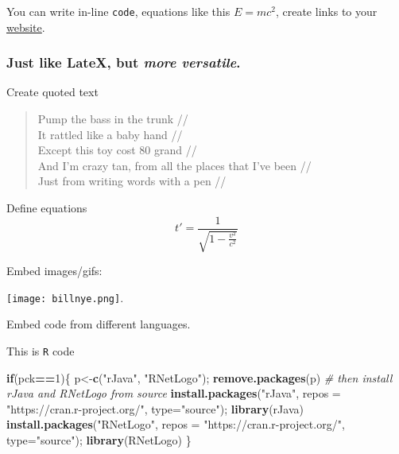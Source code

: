 \documentclass[10,portrait]{article}
\newenvironment{Shaded}{\begin{snugshade}}{\end{snugshade}}
\newcommand{\KeywordTok}[1]{\textcolor[rgb]{0.13,0.29,0.53}{\textbf{#1}}}
\newcommand{\DataTypeTok}[1]{\textcolor[rgb]{0.13,0.29,0.53}{#1}}
\newcommand{\DecValTok}[1]{\textcolor[rgb]{0.00,0.00,0.81}{#1}}
\newcommand{\StringTok}[1]{\textcolor[rgb]{0.31,0.60,0.02}{#1}}
\newcommand{\CommentTok}[1]{\textcolor[rgb]{0.56,0.35,0.01}{\textit{#1}}}
\newcommand{\ControlFlowTok}[1]{\textcolor[rgb]{0.13,0.29,0.53}{\textbf{#1}}}
\newcommand{\OperatorTok}[1]{\textcolor[rgb]{0.81,0.36,0.00}{\textbf{#1}}}
\newcommand{\NormalTok}[1]{#1}
\begin{document}
You can write in-line \texttt{code}, equations like this \(E = mc^{2}\),
create links to your \href{https://github.com/darwinanddavis}{website}.

\subsubsection{\texorpdfstring{Just like LateX, but \emph{more
versatile}.}{Just like LateX, but more versatile.}}\label{just-like-latex-but-more-versatile.}

Create quoted text

\begin{quote}
Pump the bass in the trunk //\\
It rattled like a baby hand //\\
Except this toy cost 80 grand //\\
And I'm crazy tan, from all the places that I've been //\\
Just from writing words with a pen //
\end{quote}

Define equations\\
\[
t'=
\frac
{1}
{
\sqrt{1 - \frac
{v^{2}}
{c^{2}}
}
}
\]

Embed images/gifs:

\texttt{[image: billnye.png]}.

\newpage  

Embed code from different languages.

This is \texttt{R} code

\begin{Shaded}
\begin{Highlighting}[]
\ControlFlowTok{if}\NormalTok{(pck}\OperatorTok{==}\DecValTok{1}\NormalTok{)\{}
\NormalTok{  p<-}\KeywordTok{c}\NormalTok{(}\StringTok{"rJava"}\NormalTok{, }\StringTok{"RNetLogo"}\NormalTok{); }\KeywordTok{remove.packages}\NormalTok{(p)}
  \CommentTok{# then install rJava and RNetLogo from source}
  \KeywordTok{install.packages}\NormalTok{(}\StringTok{"rJava"}\NormalTok{, }\DataTypeTok{repos =} \StringTok{"https://cran.r-project.org/"}\NormalTok{, }\DataTypeTok{type=}\StringTok{"source"}\NormalTok{); }\KeywordTok{library}\NormalTok{(rJava)}
  \KeywordTok{install.packages}\NormalTok{(}\StringTok{"RNetLogo"}\NormalTok{, }\DataTypeTok{repos =} \StringTok{"https://cran.r-project.org/"}\NormalTok{, }\DataTypeTok{type=}\StringTok{"source"}\NormalTok{); }\KeywordTok{library}\NormalTok{(RNetLogo)}
\NormalTok{\}}
\end{Highlighting}
\end{Shaded}
\end{document}
